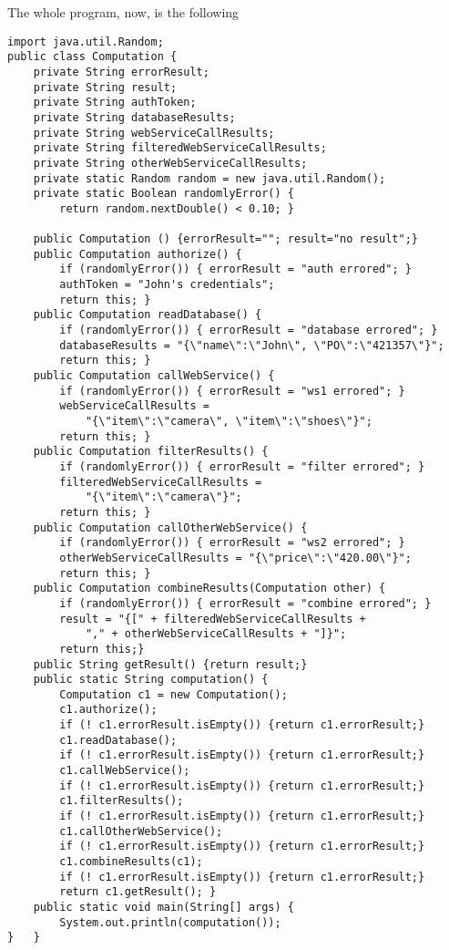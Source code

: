 \documentclass[11pt]{article}
\begin{document}
The whole program, now, is the following

\begin{verbatim}
import java.util.Random;
public class Computation {
    private String errorResult;
    private String result;
    private String authToken;
    private String databaseResults;
    private String webServiceCallResults;
    private String filteredWebServiceCallResults;
    private String otherWebServiceCallResults;
    private static Random random = new java.util.Random();
    private static Boolean randomlyError() {
        return random.nextDouble() < 0.10; }

    public Computation () {errorResult=""; result="no result";}
    public Computation authorize() {
        if (randomlyError()) { errorResult = "auth errored"; }
        authToken = "John's credentials";
        return this; }
    public Computation readDatabase() {
        if (randomlyError()) { errorResult = "database errored"; }
        databaseResults = "{\"name\":\"John\", \"PO\":\"421357\"}";
        return this; }
    public Computation callWebService() {
        if (randomlyError()) { errorResult = "ws1 errored"; }
        webServiceCallResults =
            "{\"item\":\"camera\", \"item\":\"shoes\"}";
        return this; }
    public Computation filterResults() {
        if (randomlyError()) { errorResult = "filter errored"; }
        filteredWebServiceCallResults =
            "{\"item\":\"camera\"}";
        return this; }
    public Computation callOtherWebService() {
        if (randomlyError()) { errorResult = "ws2 errored"; }
        otherWebServiceCallResults = "{\"price\":\"420.00\"}";
        return this; }
    public Computation combineResults(Computation other) {
        if (randomlyError()) { errorResult = "combine errored"; }
        result = "{[" + filteredWebServiceCallResults +
            "," + otherWebServiceCallResults + "]}"; 
        return this;}
    public String getResult() {return result;}
    public static String computation() {
        Computation c1 = new Computation();
        c1.authorize();
        if (! c1.errorResult.isEmpty()) {return c1.errorResult;}
        c1.readDatabase();
        if (! c1.errorResult.isEmpty()) {return c1.errorResult;}
        c1.callWebService();
        if (! c1.errorResult.isEmpty()) {return c1.errorResult;}
        c1.filterResults();
        if (! c1.errorResult.isEmpty()) {return c1.errorResult;}
        c1.callOtherWebService();
        if (! c1.errorResult.isEmpty()) {return c1.errorResult;}
        c1.combineResults(c1);
        if (! c1.errorResult.isEmpty()) {return c1.errorResult;}
        return c1.getResult(); }
    public static void main(String[] args) {
        System.out.println(computation());
}   }
\end{verbatim}
\end{document}
